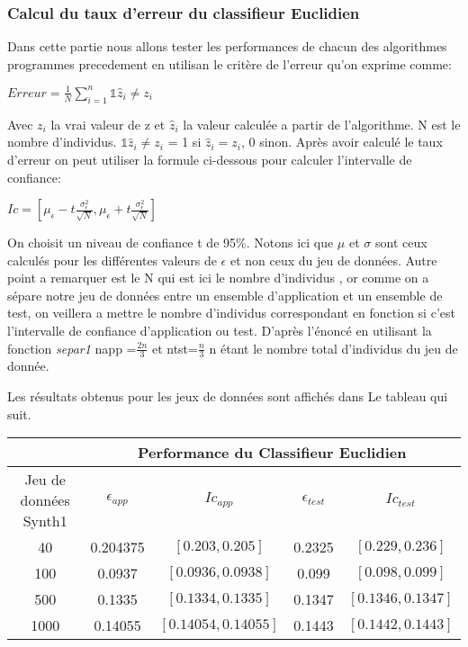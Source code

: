 \documentclass[10pt]{article}
\begin{document}
			\subsubsection{Calcul du taux d'erreur du classifieur Euclidien }
			Dans cette partie nous allons tester les performances de chacun des algorithmes programmes precedement en utilisan le critère de l'erreur qu'on exprime comme:
			\begin{center}
			$Erreur = \frac{1}{N} \sum_{i=1}^{n} {\mathds{1} \hat{z}_{i}  \neq z_{i}}$
			\end{center}
		Avec $z_{i}$ la vrai valeur de z et $\hat{z}_{i}$ la valeur calculée a partir de l'algorithme. N est le nombre d'individus. $\mathds{1} \hat{z}_{i}  \neq z_{i}$ = 1 si $\hat{z}_{i}  = z_{i}$, 0 sinon.
		Après avoir calculé le taux d'erreur on peut utiliser la formule ci-dessous pour calculer l'intervalle de confiance:
		\begin{center}
		$Ic = [\mu_\epsilon - t \frac{\sigma_{\epsilon}^2}{\sqrt{N}}, \mu_\epsilon + t \frac{\sigma_{\epsilon}^2}{\sqrt{N}}]$
		\end{center}
	
		On choisit un niveau de confiance t de 95\%. Notons ici que  $\mu$ et $\sigma$ sont ceux calculés pour les différentes valeurs de $\epsilon$ et non ceux du jeu de données. Autre point a remarquer est le N qui est ici le nombre d'individus , or comme on a sépare notre jeu de données entre un ensemble d'application et un ensemble de test, on veillera a mettre le nombre d'individus correspondant en fonction si c'est l'intervalle de confiance  d'application ou test. D'après l'énoncé en utilisant la fonction \textit{separ1} napp =$\frac{2n}{3}$  et ntst=$\frac{n}{3}$ n étant le nombre total d'individus du jeu de donnée.
			
			Les résultats obtenus pour les jeux de données sont affichés dans Le tableau qui suit.
			\begin{center}		
				\begin{tabular}{ | c | c| c | c | c |}
						\rowcolor{lightgray} 
				   	&  \multicolumn{4}{|c|}{ Performance du  Classifieur Euclidien}\\
					
					\hline
					Jeu de données Synth1  &  $\epsilon_{app}$ &  $Ic_{app}$&  $\epsilon_{test}$ &  $Ic_{test}$  \\
					\hline
					\multirow{1}{*}{40}   & 0.204375    & $[ 0.203, 0.205]$& 0.2325      & 	$[0.229, 0.236]$ \\
																
					\hline
					\multirow{1}{*}{100}      & 0.0937   &   $[0.0936, 0.0938]$& 0.099   & 	$[0.098, 0.099]$  \\
				
					\hline
					\multirow{1}{*}{500}     & 0.1335   &   $[0.1334, 0.1335]$& 0.1347    & 	$[0.1346, 0.1347]$	\\
				
					\hline
					\multirow{1}{*}{1000}    & 0.14055    & $[0.14054, 0.14055]$ &  0.1443    & $[0.1442, 0.1443]$  	\\
				
					\hline
				\end{tabular}
			\end{center}
		
\end{document}
